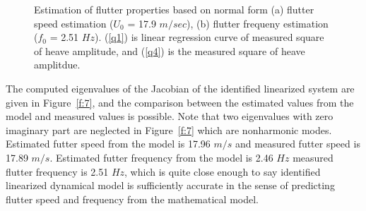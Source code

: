 \documentclass[openacc]{rsproca_new}%
\newcommand{\Fref}[1]{Figure~\ref{#1}}
\begin{document}
\begin{figure}
  \centering
\caption{Estimation of flutter properties based on normal form (a) flutter speed estimation ($U_0$ = 17.9 $m/sec$), (b) flutter frequeny estimation ($f_0$ = 2.51 $Hz$). (\ref{q1}) is linear regression curve of measured square of heave amplitude, and (\ref{q4}) is the measured square of heave amplitdue.}
\label{f:6}
\end{figure}

The computed eigenvalues of the Jacobian of the identified linearized system are given in \Fref{f:7}, and the comparison between the estimated values from the model and measured values is possible. Note that two eigenvalues with zero imaginary part are neglected in \Fref{f:7} which are nonharmonic modes. Estimated futter speed from the model is 17.96 $m/s$ and measured futter speed is 17.89 $m/s$. Estimated futter frequency from the model is 2.46 $Hz$ measured flutter frequency is 2.51 $Hz$, which is quite close enough to say identified linearized dynamical model is sufficiently accurate in the sense of predicting flutter speed and frequency from the mathematical model.
\end{document}
